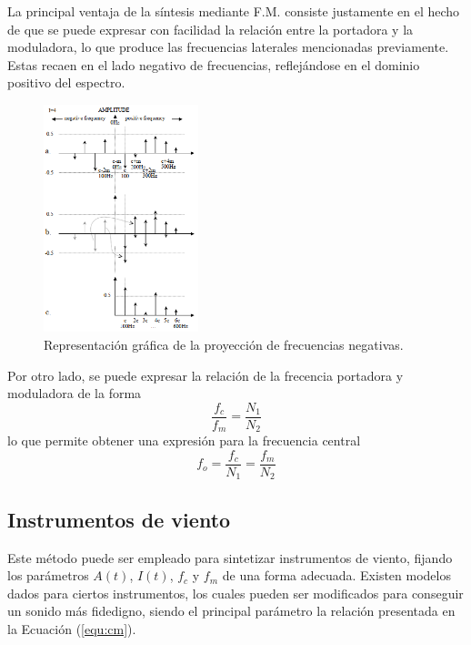 La principal ventaja de la síntesis mediante F.M. consiste justamente en el hecho de que se puede expresar con facilidad la relación entre la portadora y la moduladora, lo que produce las frecuencias laterales mencionadas previamente. Estas recaen en el lado negativo de frecuencias, reflejándose en el dominio positivo del espectro. 
\begin{figure}[H]
	\centering
	\includegraphics[width=0.4\textwidth]{ImagenesEjercicio3/Reflecting-f.png}
	\caption{Representación gráfica de la proyección de frecuencias negativas.}
	\label{fig:freflect}
\end{figure}

Por otro lado, se puede expresar la relación de la frecencia portadora y moduladora de la forma
\begin{equation}
	\frac{f_c}{f_m} = \frac{N_1}{N_2}
	\label{equ:cm}
\end{equation}
lo que permite obtener una expresión para la frecuencia central
\begin{equation}
	f_o = \frac{f_c}{N_1} = \frac{f_m}{N_2}
\end{equation}

\subsection{Instrumentos de viento}
Este método puede ser empleado para sintetizar instrumentos de viento, fijando los parámetros $A(t)$, $I(t)$, $f_c$ y $f_m$ de una forma adecuada. Existen modelos dados para ciertos instrumentos, los cuales pueden ser modificados para conseguir un sonido más fidedigno, siendo el principal parámetro la relación presentada en la Ecuación (\ref{equ:cm}).

